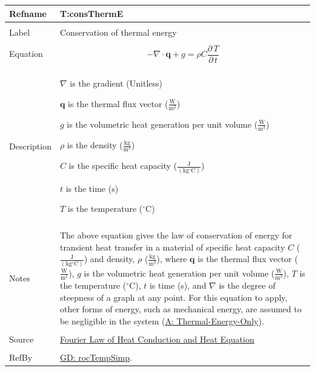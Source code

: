 \documentclass[12pt]{article}
\begin{document}
\noindent \begin{minipage}{\textwidth}
\begin{tabular}{p{} p{}}
\toprule \textbf{Refname} & \textbf{T:consThermE}
\label{T:consThermE}
\\ \midrule \\
Label & Conservation of thermal energy
\\ \midrule \\
Equation & \begin{dmath}
           -∇\cdot{}\mathbf{q}+g=ρ C \frac{\partial{}\,T}{\partial{}\,t}
           \end{dmath}
\\ \midrule \\
Description & \begin{symbDescription}
              \item{$∇$ is the gradient (Unitless)}
              \item{$\mathbf{q}$ is the thermal flux vector ($\frac{\text{W}}{\text{m}^{2}}$)}
              \item{$g$ is the volumetric heat generation per unit volume ($\frac{\text{W}}{\text{m}^{3}}$)}
              \item{$ρ$ is the density ($\frac{\text{kg}}{\text{m}^{3}}$)}
              \item{$C$ is the specific heat capacity ($\frac{\text{J}}{(\text{kg}{}^{\circ}\text{C})}$)}
              \item{$t$ is the time (s)}
              \item{$T$ is the temperature (${}^{\circ}$C)}
              \end{symbDescription}
\\ \midrule \\
Notes & The above equation gives the law of conservation of energy for transient heat transfer in a material of specific heat capacity $C$ ($\frac{\text{J}}{(\text{kg}{}^{\circ}\text{C})}$) and density, $ρ$ ($\frac{\text{kg}}{\text{m}^{3}}$), where $\mathbf{q}$ is the thermal flux vector ($\frac{\text{W}}{\text{m}^{2}}$), $g$ is the volumetric heat generation per unit volume ($\frac{\text{W}}{\text{m}^{3}}$), $T$ is the temperature (${}^{\circ}$C), $t$ is time (s), and $∇$ is the degree of steepness of a graph at any point. For this equation to apply, other forms of energy, such as mechanical energy, are assumed to be negligible in the system (\hyperref[A:Thermal-Energy-Only]{A: Thermal-Energy-Only}).
\\ \midrule \\
Source & \hyperref[http://www.efunda.com/formulae/heat_transfer/conduction/overview_cond.cfm]{Fourier Law of Heat Conduction and Heat Equation}
\\ \midrule \\
RefBy & \hyperref[GD:rocTempSimp]{GD: rocTempSimp}.
\\ \bottomrule \end{tabular}
\end{minipage}\\
\end{document}
